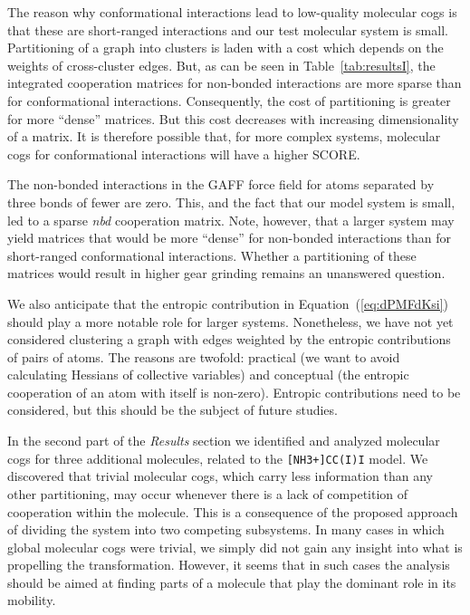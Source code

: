 \documentclass[a4paper,11pt,twoside]{book}%
\begin{document}
The reason why conformational interactions lead to low-quality molecular cogs is that these are short-ranged interactions and our test molecular system is small.
Partitioning of a graph into clusters is laden with a cost which depends on the weights of cross-cluster edges.
But, as can be seen in Table~\ref{tab:resultsI}, the integrated cooperation matrices for non-bonded interactions are more sparse than for conformational interactions.
Consequently, the cost of partitioning is greater for more ``dense'' matrices.
But this cost decreases with increasing dimensionality of a matrix. 
It is therefore possible that, for more complex systems, molecular cogs for conformational interactions will have a higher SCORE.

The non-bonded interactions in the GAFF force field for atoms separated by three {\color{black}bonds of fewer} are zero.
This, and the fact that our model {\color{black}system} is small, led to a sparse \emph{nbd} cooperation matrix.
Note, however, that a larger system may yield matrices that would be more ``dense'' for non-bonded interactions than for short-ranged conformational interactions.
Whether a partitioning of these matrices would result in higher gear grinding remains an unanswered question.

We also anticipate that the entropic contribution in Equation~(\ref{eq:dPMFdKsi}) should play a more notable role for larger systems.
Nonetheless, we have not yet considered clustering a graph with edges weighted by the entropic contributions of pairs of atoms.
The reasons are twofold: practical (we want to avoid calculating Hessians of collective variables) and conceptual (the entropic cooperation of an atom with itself is non-zero).
Entropic contributions need to be considered, but this should be the subject of future studies.

{\color{black}
In the second part of the \emph{Results} section we identified and analyzed molecular cogs for three additional molecules, related to the \texttt{[NH3+]CC(I)I} model.
We discovered that trivial molecular cogs, which carry less information than any other partitioning, may occur whenever there is a lack of competition of cooperation within the molecule.
This is a consequence of the proposed approach of dividing the system into two competing subsystems.
In many cases in which global molecular cogs were trivial, we simply did not gain any insight into what is propelling the transformation.
However, it seems that in such cases the analysis should be aimed at finding parts of a molecule that play the dominant role in its mobility.
}
\end{document}
